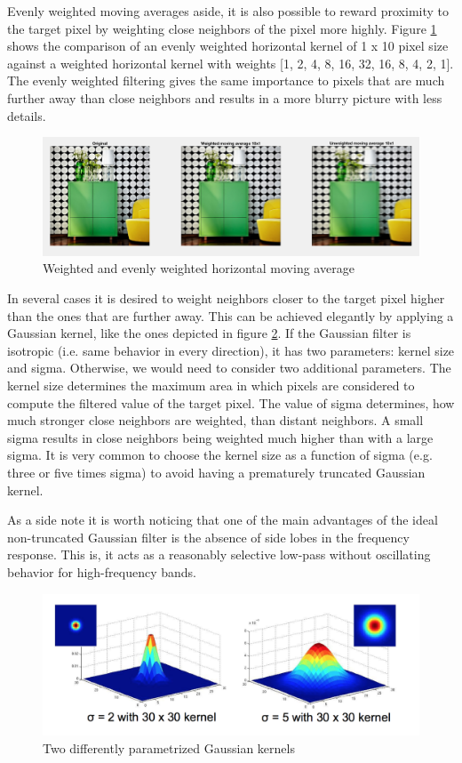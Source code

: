 Evenly weighted moving averages aside, it is also possible to reward proximity to the target pixel by weighting close neighbors of the pixel more highly. Figure \ref{fig:task11} shows the comparison of an evenly weighted horizontal kernel of 1 x 10 pixel size against a weighted horizontal kernel with weights [1, 2, 4, 8, 16, 32, 16, 8, 4, 2, 1]. The evenly weighted filtering gives the same importance to pixels that are much further away than close neighbors and results in a more blurry picture with less details.

\begin{figure}[!hbt]
  \includegraphics[width=\textwidth]{./img/task11.png}
  \caption{Weighted and evenly weighted horizontal moving average}
  \label{fig:task11}
\end{figure}

In several cases it is desired to weight neighbors closer to the target pixel higher than the ones that are further away. This can be achieved elegantly by applying a Gaussian kernel, like the ones depicted in figure \ref{fig:task12}. If the Gaussian filter is isotropic (i.e. same behavior in every direction), it has two parameters: kernel size and sigma. Otherwise, we would need to consider two additional parameters. The kernel size determines the maximum area in which pixels are considered to compute the filtered value of the target pixel. The value of sigma determines, how much stronger close neighbors are weighted, than distant neighbors. A small sigma results in close neighbors being weighted much higher than with a large sigma. It is very common to choose the kernel size as a function of sigma (e.g. three or five times sigma) to avoid having a prematurely truncated Gaussian kernel.

As a side note it is worth noticing that one of the main advantages of the ideal non-truncated Gaussian filter is the absence of side lobes in the frequency response. This is, it acts as a reasonably selective low-pass without oscillating behavior for high-frequency bands.

\begin{figure}[!hbt]
  \includegraphics[width=\textwidth]{./img/task12.png}
  \caption{Two differently parametrized Gaussian kernels}
  \label{fig:task12}
\end{figure}

